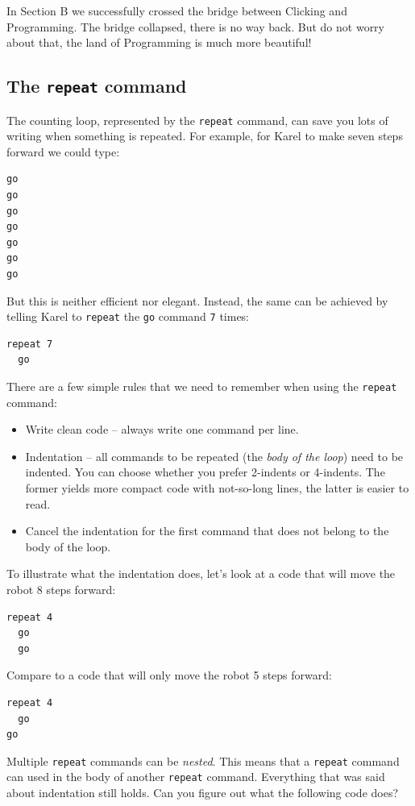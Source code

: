 \documentclass[article,A4,12pt]{llncs}
\begin{document}
\noindent
In Section B we successfully crossed the bridge between Clicking  
and Programming. The bridge collapsed, there is no way back. But do 
not worry about that, the land of Programming is much more beautiful!


\subsection{The {\tt repeat} command}

The counting loop, represented by the {\tt repeat} command, can save 
you lots of writing when something is repeated. For example, for 
Karel to make seven steps forward we could type:

\begin{verbatim}
go
go
go
go
go
go
go
\end{verbatim}
But this is neither efficient nor elegant. Instead, the same can be
achieved by telling Karel to {\tt repeat} the {\tt go} command {\tt 7} times:

\begin{verbatim}
repeat 7
  go
\end{verbatim}
There are a few simple rules that we need to remember when using the {\tt repeat} command:

\begin{itemize}
\item Write clean code -- always write one command per line.
\item Indentation -- all commands to be repeated (the {\em body of the loop}) need to be indented. You can
      choose whether you prefer 2-indents or 4-indents. The former yields more compact 
      code with not-so-long lines, the latter is easier to read. 
\item Cancel the indentation for the first command that does not belong to the body of the loop.
\end{itemize}
To illustrate what the indentation does, let's look at a code that will move the robot 8 steps forward:

\begin{verbatim}
repeat 4
  go
  go
\end{verbatim}
Compare to a code that will only move the robot 5 steps forward:

\begin{verbatim}
repeat 4
  go
go
\end{verbatim}
Multiple {\tt repeat} commands can be {\em nested}. This means that a {\tt repeat} command 
can used in the body of another {\tt repeat} command. Everything that was said about indentation 
still holds. Can you figure out what the following code does?
\end{document}
